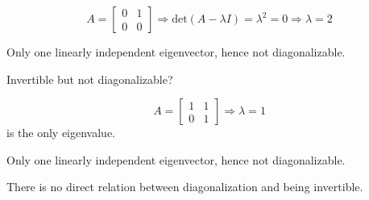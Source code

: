 \documentclass{article}
\begin{document}
\[ A = \begin{bmatrix} 0 & 1 \\ 0 & 0 \end{bmatrix} \Rightarrow \text{det}(A-\lambda I) = \lambda^2 = 0 \Rightarrow \lambda = 2 \]

Only one linearly independent eigenvector, hence not diagonalizable.

Invertible but not diagonalizable? 

\[ A = \begin{bmatrix} 1 & 1 \\ 0 & 1 \end{bmatrix} \Rightarrow \lambda = 1 \] is the only eigenvalue.

Only one linearly independent eigenvector, hence not diagonalizable.

There is no direct relation between diagonalization and being invertible.




\end{document}
